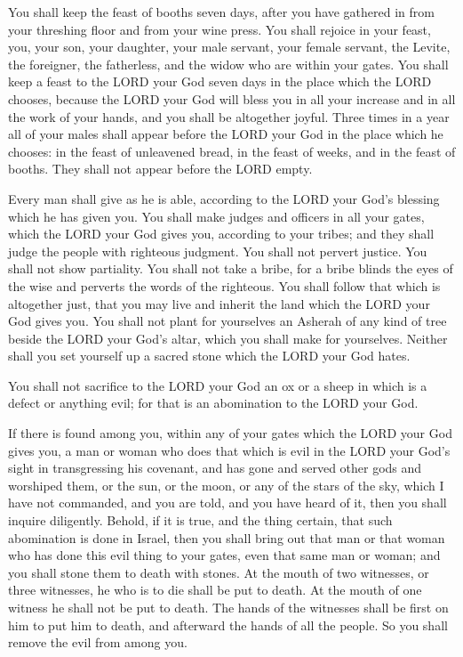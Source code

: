 \myverse{}You shall keep the feast of booths seven days, after you have
gathered in from your threshing floor and from your wine press.
\myverse{}You shall rejoice in your feast, you, your son, your daughter, your male
servant, your female servant, the Levite, the foreigner, the fatherless, and the widow who are within
your gates.
\myverse{}You shall keep a feast to the LORD your God seven days in the place which
the LORD chooses, because the LORD your God will bless you in all your increase and in all the work of
your hands, and you shall be altogether joyful.
\myverse{}Three times in a year all of your males shall appear before the LORD your
God in the place which he chooses: in the feast of unleavened bread, in the feast of weeks, and in the
feast of booths. They shall not appear before the LORD empty.

\myverse{}Every man shall give as he is able, according to the LORD your God’s blessing
which he has given you.
\myverse{}You shall make judges and officers in all your gates, which the LORD your
God gives you, according to your tribes; and they shall judge the people with righteous judgment.
\myverse{}You shall not pervert justice. You shall not show partiality. You shall not
take a bribe, for a bribe blinds the eyes of the wise and perverts the words of the righteous.
\myverse{}You shall follow that which is altogether just, that you may live and inherit
the land which the LORD your God gives you.
\myverse{}You shall not plant for yourselves an Asherah of any kind of tree beside
the LORD your God’s altar, which you shall make for yourselves.
\myverse{}Neither shall you set yourself up a sacred stone which the LORD your God
hates.


\mychapter{} \myverse*{}You shall not sacrifice to the LORD your God an ox or a sheep
in which is a defect or anything evil; for that is an abomination to the LORD your God.


\myverse{}If there is found among you, within any of your gates which the
LORD your God gives you, a man or woman who does that which is evil in the LORD your God’s sight in transgressing
his covenant,
\myverse{}and has gone and served other gods and worshiped them, or the sun, or the moon,
or any of the stars of the sky, which I have not commanded,
\myverse{}and you are told, and you have heard of it, then you shall inquire diligently.
Behold, if it is true, and the thing certain, that such abomination is done in Israel,
\myverse{}then you shall bring out that man or that woman who has done this evil thing
to your gates, even that same man or woman; and you shall stone them to death with stones.
\myverse{}At the mouth of two witnesses, or three witnesses, he who is to die shall be
put to death. At the mouth of one witness he shall not be put to death.
\myverse{}The hands of the witnesses shall be first on him to put him to death, and afterward
the hands of all the people. So you shall remove the evil from among you.


